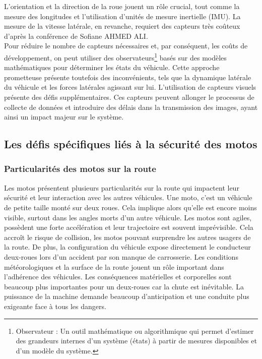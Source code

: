L'orientation et la direction de la roue jouent un rôle crucial, tout comme la mesure des longitudes et l'utilisation d'unités de mesure inertielle (IMU). La mesure de la vitesse latérale, en revanche, requiert des capteurs très coûteux d'après la conférence\cite{ahmed_ali_synthese_2024} de Sofiane AHMED ALI.\\
Pour réduire le nombre de capteurs nécessaires et, par conséquent, les coûts de développement, on peut utiliser des observateurs\footnote{Observateur : Un outil mathématique ou algorithmique qui permet d’estimer des grandeurs internes d’un système (états) à partir de mesures disponibles et d’un modèle du système.} basés sur des modèles mathématiques pour déterminer les états du véhicule. Cette approche prometteuse présente toutefois des inconvénients, tels que la dynamique latérale du véhicule et les forces latérales agissant sur lui.
L'utilisation de capteurs visuels présente des défis supplémentaires. Ces capteurs peuvent allonger le processus de collecte de données et introduire des délais dans la transmission des images, ayant ainsi un impact majeur sur le système.


\newpage
\subsection{Les défis spécifiques liés à la sécurité des motos}

\subsubsection{Particularités des motos sur la route}
Les motos présentent plusieurs particularités sur la route qui impactent leur sécurité et leur interaction avec les autres véhicules.
Une moto, c'est un véhicule de petite taille monté sur deux roues. Cela implique alors qu'elle est encore moins visible, surtout dans les angles morts d'un autre véhicule. Les motos sont agiles, possèdent une forte accélération et leur trajectoire est souvent imprévisible.  Cela accroît le risque de collision, les motos pouvant surprendre les autres usagers de la route. De plus, la configuration du véhicule expose directement le conducteur deux-roues lors d'un accident par son manque de carrosserie. Les conditions météorologiques et la surface de la route jouent un rôle important dans l'adhérence des véhicules. Les conséquences matérielles et corporelles sont beaucoup plus importantes pour un deux-roues car la chute est inévitable.
La puissance de la machine demande beaucoup d'anticipation et une conduite plus exigeante face à tous les dangers.\\

